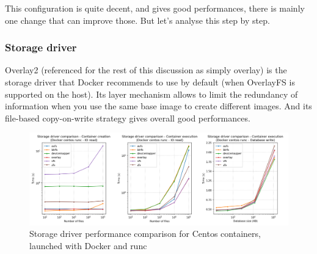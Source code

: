 This configuration is quite decent, and gives good performances, there is mainly one change that can improve those.  But let's analyse this step by step.

\subsubsection{Storage driver}
Overlay2 (referenced for the rest of this discussion as simply overlay) is the storage driver that Docker recommends to use by default (when OverlayFS is supported on the host).  Its layer mechanism allows to limit the redundancy of information when you use the same base image to create different images.  And its file-based copy-on-write strategy gives overall good performances.

\begin{figure}[h!]
  \begin{center}
    \includegraphics[width=\linewidth]{images/question-1-storage-driver.png}
    \caption{Storage driver performance comparison for Centos containers, launched with Docker and runc}
    \label{fig:q1:storage-driver}
  \end{center}
\end{figure}

